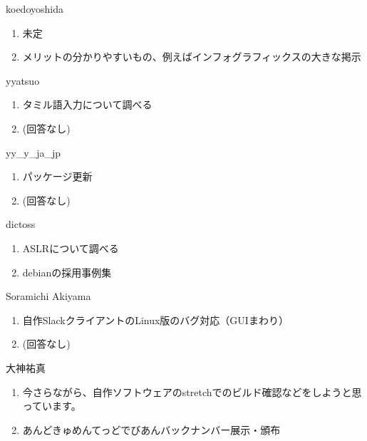 \begin{prework}{ koedoyoshida }
  \begin{enumerate}
  \item 未定
  \item メリットの分かりやすいもの、例えばインフォグラフィックスの大きな掲示
  \end{enumerate}
\end{prework}

\begin{prework}{ yyatsuo }
  \begin{enumerate}
  \item タミル語入力について調べる
  \item (回答なし)
  \end{enumerate}
\end{prework}

\begin{prework}{ yy\_y\_ja\_jp }
  \begin{enumerate}
  \item パッケージ更新
  \item (回答なし)
  \end{enumerate}
\end{prework}

\begin{prework}{ dictoss }
  \begin{enumerate}
  \item ASLRについて調べる
  \item debianの採用事例集
  \end{enumerate}
\end{prework}

\begin{prework}{ Soramichi Akiyama }
  \begin{enumerate}
  \item 自作SlackクライアントのLinux版のバグ対応（GUIまわり）
  \item (回答なし)
  \end{enumerate}
\end{prework}

\begin{prework}{ 大神祐真 }
  \begin{enumerate}
  \item 今さらながら、自作ソフトウェアのstretchでのビルド確認などをしようと思っています。
  \item あんどきゅめんてっどでびあんバックナンバー展示・頒布
  \end{enumerate}
\end{prework}
